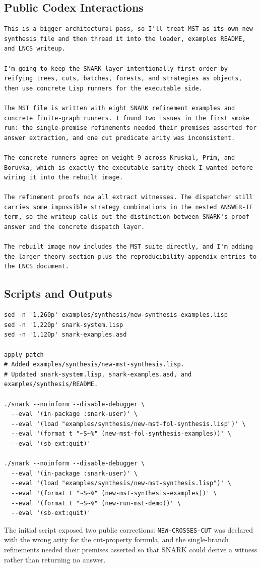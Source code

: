 \documentclass[runningheads]{llncs}
\begin{document}
\subsection{Public Codex Interactions}

\begin{lstlisting}
This is a bigger architectural pass, so I'll treat MST as its own new synthesis file and then thread it into the loader, examples README, and LNCS writeup.

I'm going to keep the SNARK layer intentionally first-order by reifying trees, cuts, batches, forests, and strategies as objects, then use concrete Lisp runners for the executable side.

The MST file is written with eight SNARK refinement examples and concrete finite-graph runners. I found two issues in the first smoke run: the single-premise refinements needed their premises asserted for answer extraction, and one cut predicate arity was inconsistent.

The concrete runners agree on weight 9 across Kruskal, Prim, and Boruvka, which is exactly the executable sanity check I wanted before wiring it into the rebuilt image.

The refinement proofs now all extract witnesses. The dispatcher still carries some impossible strategy combinations in the nested ANSWER-IF term, so the writeup calls out the distinction between SNARK's proof answer and the concrete dispatch layer.

The rebuilt image now includes the MST suite directly, and I'm adding the larger theory section plus the reproducibility appendix entries to the LNCS document.
\end{lstlisting}

\subsection{Scripts and Outputs}

\begin{lstlisting}
sed -n '1,260p' examples/synthesis/new-synthesis-examples.lisp
sed -n '1,220p' snark-system.lisp
sed -n '1,120p' snark-examples.asd

apply_patch
# Added examples/synthesis/new-mst-synthesis.lisp.
# Updated snark-system.lisp, snark-examples.asd, and examples/synthesis/README.

./snark --noinform --disable-debugger \
  --eval '(in-package :snark-user)' \
  --eval '(load "examples/synthesis/new-mst-fol-synthesis.lisp")' \
  --eval '(format t "~S~%" (new-mst-fol-synthesis-examples))' \
  --eval '(sb-ext:quit)'

./snark --noinform --disable-debugger \
  --eval '(in-package :snark-user)' \
  --eval '(load "examples/synthesis/new-mst-synthesis.lisp")' \
  --eval '(format t "~S~%" (new-mst-synthesis-examples))' \
  --eval '(format t "~S~%" (new-run-mst-demo))' \
  --eval '(sb-ext:quit)'
\end{lstlisting}
The initial script exposed two public corrections: \texttt{NEW-CROSSES-CUT}
was declared with the wrong arity for the cut-property formula, and the
single-branch refinements needed their premises asserted so that SNARK could
derive a witness rather than returning no answer.
\end{document}
